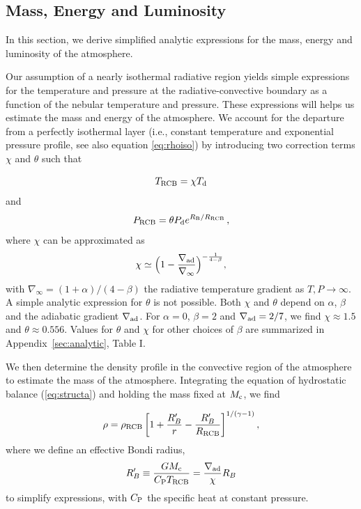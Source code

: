 \documentclass[apj]{emulateapj}
\newcommand{\delad}{\nabla_{\rm ad}}
\newcommand{\App}[1]{Appendix~\ref{#1}}
\newcommand{\co}{_{\rm c}}
\newcommand{\di}{_{\rm d}}
\newcommand{\cb}{_{\rm RCB}}
\begin{document}
\subsection{Mass, Energy and Luminosity}
\label{MELan}

In this section, we derive simplified analytic expressions for the mass, energy and luminosity of the atmosphere.

Our assumption of a nearly isothermal radiative region yields simple expressions for the temperature and pressure at the radiative-convective boundary as a function of the nebular temperature and pressure. These expressions will helps us estimate the mass and energy of the atmosphere. We account for the departure from a perfectly isothermal layer (i.e., constant temperature and exponential pressure profile, see also equation \ref{eq:rhoiso}) by introducing two correction terms $\chi$ and $\theta$ such that

\begin{equation}
\label{eq:Tcb}
T\cb = \chi T\di
\end{equation} 
and
 \begin{equation}\label{eq:PcbRcb}
P\cb = \theta P_{\rm d} e^{R_{\rm B}/R\cb} \, ,
\end{equation}
where $\chi$ can be approximated as
\begin{equation}
\label{eq:chi}
\chi \simeq \Big(1-\frac{\delad}{\nabla_{\infty}} \Big)^{-\frac{1}{4-\beta}} ,
\end{equation}
with $\nabla_{\infty}=(1+\alpha)/(4-\beta)$ the radiative temperature gradient as $T, P \rightarrow \infty$. A simple analytic expression for $\theta$ is not possible. Both $\chi$ and $\theta$ depend on $\alpha$, $\beta$ and the adiabatic gradient $\delad$. For $\alpha=0$, $\beta=2$ and $\delad=2/7$, we find $\chi \approx 1.5$ and $\theta \approx 0.556$. Values for $\theta$ and $\chi$ for other choices of $\beta$ are summarized in \App{sec:analytic}, Table I. 

We then determine the density profile in the convective region of the atmosphere to estimate the mass of the atmosphere. Integrating the equation of hydrostatic balance (\ref{eq:structa}) and holding the mass fixed at $M\co$, we find

\begin{equation}\label{eq:rhoconv} 
\rho = \rho\cb \left[ 1 + {R_B' \over r} - {R_B' \over R\cb}  \right]^{1/(\gamma -1)},
\end{equation} 
where we define an effective Bondi radius,
\begin{equation}
R_B' \equiv {G M\co \over C_{\rm P} T\cb} = {\delad \over \chi} R_B
\end{equation} 
to simplify expressions, with $C_{\rm P}$ the specific heat at constant pressure.
\end{document}
